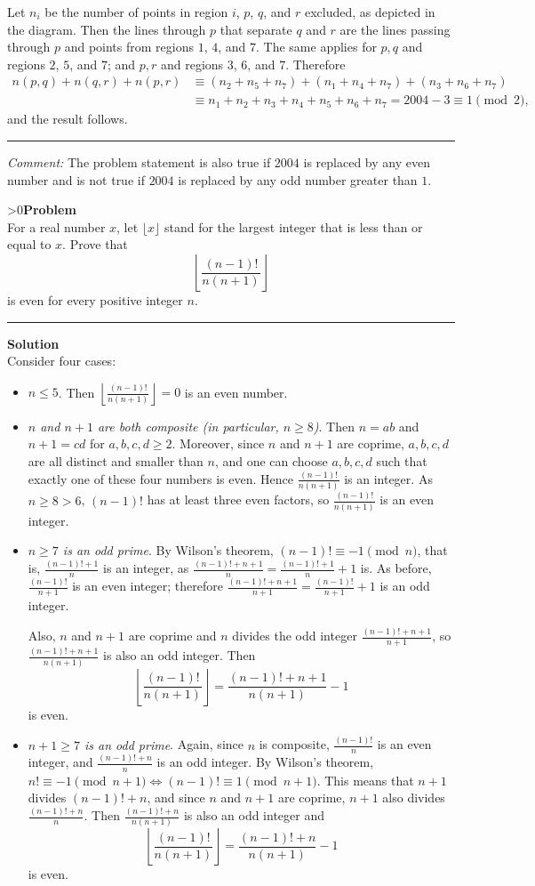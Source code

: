 \documentclass[12pt,oneside,a4paper]{book}
\newcounter{probnum}
\newcounter{solnum}
\newcommand{\prob}{\ifnum\value{probnum}>0\newpage\fi\setcounter{solnum}{0}\stepcounter{probnum}\textbf{Problem \theprobnum}\\}
\newcommand{\comment}{\medskip\hrule\medbreak\emph{Comment: }}
\newcommand{\sol}{\medskip\hrule\medbreak\textbf{Solution}\\}
\begin{document}
Let $n_i$ be the number of points in region $i$, $p$, $q$, and $r$ excluded, as depicted in the diagram. Then the lines through $p$ that separate $q$ and $r$ are the lines passing through $p$ and points from regions $1$, $4$, and $7$. The same applies for $p,q$ and regions $2$, $5$, and $7$; and $p,r$ and regions $3$, $6$, and $7$. Therefore
\begin{align*}
n(p,q) + n(q,r) + n(p,r) &\equiv (n_2 + n_5 + n_7) + (n_1 + n_4 + n_7) + (n_3 + n_6 + n_7) \\
&\equiv n_1 + n_2 + n_3 + n_4 + n_5 + n_6 + n_7 = 2004 - 3 \equiv 1 \pmod 2,
\end{align*}
and the result follows.

\comment The problem statement is also true if $2004$ is replaced by any even number and is not true if $2004$ is replaced by any odd number greater than $1$.

\prob For a real number $x$, let $\lfloor x\rfloor$ stand for the largest integer that is less than or equal to $x$. Prove that
\[\left\lfloor\frac{(n-1)!}{n(n+1)}\right\rfloor\]
is even for every positive integer $n$.

\sol
Consider four cases:
\begin{itemize}
\item $n\le 5$. Then $\left\lfloor\frac{(n-1)!}{n(n+1)}\right\rfloor = 0$ is an even number.
\item \emph{$n$ and $n+1$ are both composite (in particular, $n\ge 8$)}. Then $n=ab$ and $n+1=cd$ for $a,b,c,d\ge 2$. Moreover, since $n$ and $n+1$ are coprime, $a,b,c,d$ are all distinct and smaller than $n$, and one can choose $a,b,c,d$ such that exactly one of these four numbers is even. Hence $\frac{(n-1)!}{n(n+1)}$ is an integer. As $n\ge 8 > 6$, $(n-1)!$ has at least three even factors, so $\frac{(n-1)!}{n(n+1)}$ is an even integer.
\item \emph{$n\ge 7$ is an odd prime}. By Wilson's theorem, $(n-1)!\equiv-1\pmod n$, that is, $\frac{(n-1)!+1}n$ is an integer, as $\frac{(n-1)!+n+1}n = \frac{(n-1)!+1}n+1$ is. As before, $\frac{(n-1)!}{n+1}$ is an even integer; therefore $\frac{(n-1)! + n+1}{n+1} = \frac{(n-1)!}{n+1} + 1$ is an odd integer.

Also, $n$ and $n+1$ are coprime and $n$ divides the odd integer $\frac{(n-1)! + n+1}{n+1}$, so $\frac{(n-1)!+n+1}{n(n+1)}$ is also an odd integer. Then
\[\left\lfloor\frac{(n-1)!}{n(n+1)}\right\rfloor = \frac{(n-1)!+n+1}{n(n+1)} - 1\]
is even.
\item \emph{$n+1\ge 7$ is an odd prime}. Again, since $n$ is composite, $\frac{(n-1)!}n$ is an even integer, and $\frac{(n-1)!+n}n$ is an odd integer. By Wilson's theorem, $n!\equiv -1\pmod{n+1}\iff (n-1)!\equiv 1\pmod{n+1}$. This means that $n+1$ divides $(n-1)! + n$, and since $n$ and $n+1$ are coprime, $n+1$ also divides $\frac{(n-1)!+n}n$. Then $\frac{(n-1)!+n}{n(n+1)}$ is also an odd integer and
\[\left\lfloor\frac{(n-1)!}{n(n+1)}\right\rfloor = \frac{(n-1)!+n}{n(n+1)} - 1\]
is even.
\end{itemize}
\end{document}
